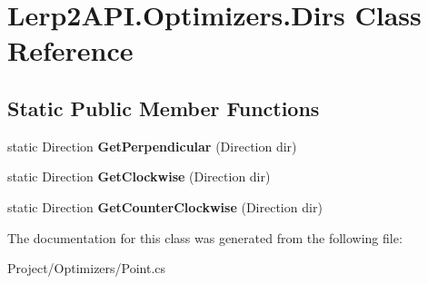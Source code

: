 \hypertarget{class_lerp2_a_p_i_1_1_optimizers_1_1_dirs}{}\section{Lerp2\+A\+P\+I.\+Optimizers.\+Dirs Class Reference}
\label{class_lerp2_a_p_i_1_1_optimizers_1_1_dirs}
\subsection*{Static Public Member Functions}
\begin{DoxyCompactItemize}
\item 
\mbox{\label{class_lerp2_a_p_i_1_1_optimizers_1_1_dirs_ac5405654ae96ef91b434fd2d28c555c0}} 
static Direction {\bfseries Get\+Perpendicular} (Direction dir)
\item 
\mbox{\label{class_lerp2_a_p_i_1_1_optimizers_1_1_dirs_a9737770f69132bccb97e85e7424cb783}} 
static Direction {\bfseries Get\+Clockwise} (Direction dir)
\item 
\mbox{\label{class_lerp2_a_p_i_1_1_optimizers_1_1_dirs_a159b07530e6726e2375b4850448ffd90}} 
static Direction {\bfseries Get\+Counter\+Clockwise} (Direction dir)
\end{DoxyCompactItemize}


The documentation for this class was generated from the following file\+:\begin{DoxyCompactItemize}
\item 
Project/\+Optimizers/Point.\+cs\end{DoxyCompactItemize}

